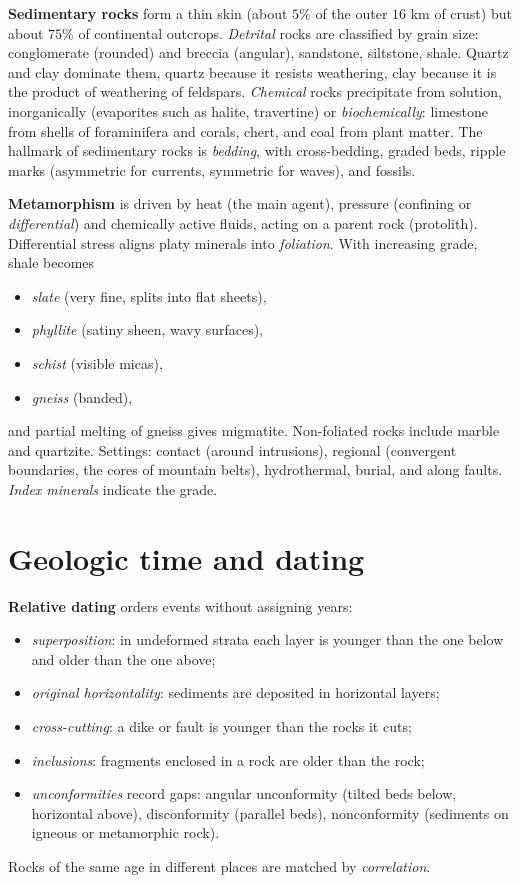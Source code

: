 \textbf{Sedimentary rocks} form a thin skin
(about $5\%$ of the outer $16$ km of
crust) but about $75\%$ of continental
outcrops. \emph{Detrital} rocks are
classified by grain size:
conglomerate (rounded) and breccia
(angular), sandstone, siltstone, shale.
Quartz and clay dominate them, quartz
because it resists weathering, clay because
it is the product of weathering of
feldspars. \emph{Chemical} rocks
precipitate from solution, inorganically
(evaporites such as halite, travertine) or
\emph{biochemically}: limestone from shells
of foraminifera and corals, chert, and coal
from plant matter. The hallmark of
sedimentary rocks is \emph{bedding}, with
cross-bedding, graded beds, ripple marks
(asymmetric for currents, symmetric for
waves), and fossils.

\textbf{Metamorphism} is driven by heat (the
main agent), pressure (confining or
\emph{differential}) and chemically active
fluids, acting on a parent rock
(protolith). Differential stress aligns
platy minerals into \emph{foliation}. With
increasing grade, shale becomes
\begin{itemize}
\item \emph{slate} (very fine, splits into
flat sheets),
\item \emph{phyllite} (satiny sheen, wavy
surfaces),
\item \emph{schist} (visible micas),
\item \emph{gneiss} (banded),
\end{itemize}
and partial melting of gneiss gives
migmatite. Non-foliated rocks include
marble and quartzite. Settings: contact
(around intrusions), regional (convergent
boundaries, the cores of mountain belts),
hydrothermal, burial, and along faults.
\emph{Index minerals} indicate the grade.

\section{Geologic time and dating}
\label{section-geologic-time}

\textbf{Relative dating} orders events
without assigning years:
\begin{itemize}
\item \emph{superposition}: in undeformed
strata each layer is younger than the one
below and older than the one above;
\item \emph{original horizontality}:
sediments are deposited in horizontal
layers;
\item \emph{cross-cutting}: a dike or fault
is younger than the rocks it cuts;
\item \emph{inclusions}: fragments enclosed
in a rock are older than the rock;
\item \emph{unconformities} record gaps:
angular unconformity (tilted beds below,
horizontal above), disconformity (parallel
beds), nonconformity (sediments on igneous
or metamorphic rock).
\end{itemize}
Rocks of the same age in different places
are matched by \emph{correlation}.

